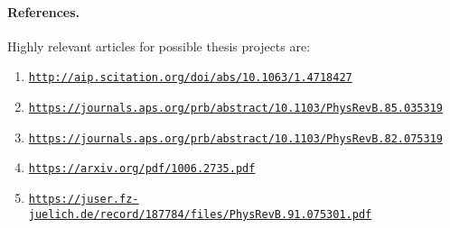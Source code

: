 \documentclass[%
oneside,                 %
final,                   %
10pt]{article}
\begin{document}
\paragraph{References.}
Highly relevant articles for possible thesis projects are:

\begin{enumerate}
\item \href{{http://aip.scitation.org/doi/abs/10.1063/1.4718427}}{\nolinkurl{http://aip.scitation.org/doi/abs/10.1063/1.4718427}}

\item \href{{https://journals.aps.org/prb/abstract/10.1103/PhysRevB.85.035319}}{\nolinkurl{https://journals.aps.org/prb/abstract/10.1103/PhysRevB.85.035319}}

\item \href{{https://journals.aps.org/prb/abstract/10.1103/PhysRevB.82.075319}}{\nolinkurl{https://journals.aps.org/prb/abstract/10.1103/PhysRevB.82.075319}}

\item \href{{https://arxiv.org/pdf/1006.2735.pdf}}{\nolinkurl{https://arxiv.org/pdf/1006.2735.pdf}}

\item \href{{https://juser.fz-juelich.de/record/187784/files/PhysRevB.91.075301.pdf}}{\nolinkurl{https://juser.fz-juelich.de/record/187784/files/PhysRevB.91.075301.pdf}}
\end{enumerate}

\noindent


\end{document}
